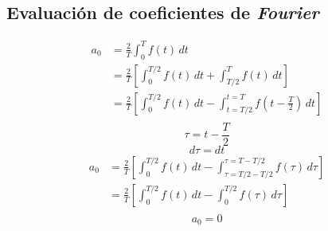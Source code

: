 \subsection{Evaluación de coeficientes de \emph{Fourier}}
\begin{equation*}
\begin{split}
    a_0
        &=\frac{2}{T}\int_0^T f(t)\,dt\\
        &=\frac{2}{T}\left[\int_0^{T/2} f(t)\,dt+\int_{T/2}^T f(t)\,dt\right]\\
        &=\frac{2}{T}\left[
            \int_0^{T/2} f(t)\,dt-\int_{t=T/2}^{t=T} f(t-\frac{T}{2})\,dt
        \right]\\
\end{split}
\end{equation*}
\begin{equation*}
    \tau=t-\frac{T}{2}
\end{equation*}
\begin{equation*}
    d\tau=dt
\end{equation*}
\begin{equation*}
\begin{split}
    a_0
        &=\frac{2}{T}\left[
            \int_0^{T/2} f(t)\,dt-
            \int_{\tau=T/2-T/2}^{\tau=T-T/2} f(\tau)\,d\tau
        \right]\\
        &=\frac{2}{T}\left[
            \int_0^{T/2} f(t)\,dt-\int_0^{T/2} f(\tau)\,d\tau
        \right]\\
\end{split}
\end{equation*}
\begin{equation}
    a_0=0
\end{equation}

